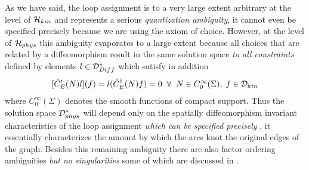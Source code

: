 \documentclass[12pt]{report}
\def\be{\begin{equation}}
\def\ee{\end{equation}}
\begin{document}
As we have said, the loop assignment is to a very large extent arbitrary 
at the level of ${\cal H}_{kin}$ and represents a serious {\it quantization
ambiguity}, it cannot even be specified precisely because we are using 
the axiom of choice. However, at the level of ${\cal H}_{phys}$ this 
ambiguity evaporates to a large extent because all choices that are 
related by a diffeomorphism result in the same solution space {\it to all
constraints} defined by elements $l\in {\cal D}^\ast_{Diff}$ which satisfy
in addition
\be \label{3.1.21}  
[\hat{C}'_E(N) l](f)=l(\hat{C}^\dagger_E(N) f)=0\;\;\forall\;\;
N\in C^\infty_0(\Sigma),\; f\in{\cal D}_{kin}
\ee
where $C^\infty_0(\Sigma)$ denotes the smooth functions of compact support.
Thus the solution space ${\cal D}^\ast_{phys}$ will depend only on the 
spatially diffeomorphism invariant characteristics of the loop assignment
{\it which can be specified precisely} \cite{41}, it essentially 
characterizes the amount by which the arcs knot the original edges of the 
graph. Besides this remaining ambiguity there are also factor ordering 
ambiguities {\it but no singularities} some of which are discussed in 
\cite{44}.
\end{document}
